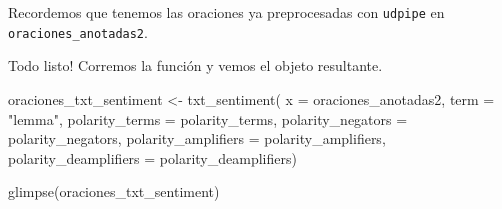 \documentclass[
]{book}
\newenvironment{Shaded}{\begin{snugshade}}{\end{snugshade}}
\newcommand{\AttributeTok}[1]{\textcolor[rgb]{0.77,0.63,0.00}{#1}}
\newcommand{\FunctionTok}[1]{\textcolor[rgb]{0.00,0.00,0.00}{#1}}
\newcommand{\NormalTok}[1]{#1}
\newcommand{\OtherTok}[1]{\textcolor[rgb]{0.56,0.35,0.01}{#1}}
\newcommand{\StringTok}[1]{\textcolor[rgb]{0.31,0.60,0.02}{#1}}
\begin{document}
Recordemos que tenemos las oraciones ya preprocesadas con \texttt{udpipe} en \texttt{oraciones\_anotadas2}.

Todo listo! Corremos la función y vemos el objeto resultante.

\begin{Shaded}
\begin{Highlighting}[]
\NormalTok{oraciones\_txt\_sentiment }\OtherTok{\textless{}{-}} \FunctionTok{txt\_sentiment}\NormalTok{(}
  \AttributeTok{x =}\NormalTok{ oraciones\_anotadas2,}
  \AttributeTok{term =} \StringTok{"lemma"}\NormalTok{,}
  \AttributeTok{polarity\_terms =}\NormalTok{ polarity\_terms,}
  \AttributeTok{polarity\_negators =}\NormalTok{ polarity\_negators,}
  \AttributeTok{polarity\_amplifiers =}\NormalTok{ polarity\_amplifiers,}
  \AttributeTok{polarity\_deamplifiers =}\NormalTok{ polarity\_deamplifiers)}

\FunctionTok{glimpse}\NormalTok{(oraciones\_txt\_sentiment)}
\end{Highlighting}
\end{Shaded}
\end{document}
